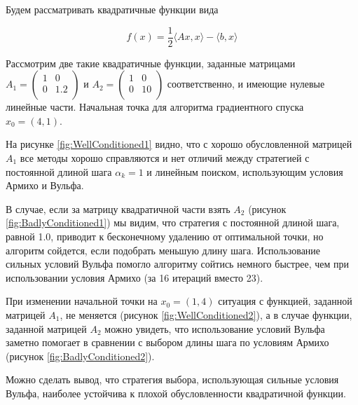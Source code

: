 \documentclass[11pt]{article}
\begin{document}
Будем рассматривать квадратичные функции вида

\begin{equation}\label{eqn:quadratic}
f(x)=\frac12\langle A x, x\rangle-\langle b, x\rangle \tag{*}
\end{equation}

Рассмотрим две такие квадратичные функции, заданные матрицами \\
$A_1 = \begin{pmatrix}
1 & 0 \\
0 & 1.2 \\
\end{pmatrix}$ и
$A_2 = \begin{pmatrix}
1 & 0 \\
0 & 10 \\
\end{pmatrix}$ соответственно, и имеющие нулевые линейные части. Начальная точка для алгоритма градиентного спуска $x_0=(4, 1)$.

На рисунке \ref{fig:WellConditioned1} видно, что с хорошо обусловленной матрицей $A_1$ все методы хорошо справляются и нет отличий между стратегией с постоянной длиной шага $\alpha_k = 1$ и линейным поиском, использующим условия Армихо и Вульфа.


В случае, если за матрицу квадратичной части взять $A_2$ (рисунок \ref{fig:BadlyConditioned1}) мы видим, что стратегия с постоянной длиной шага, равной 1.0, приводит к бесконечному удалению от оптимальной точки, но алгоритм сойдется, если подобрать меньшую длину шага. Использование сильных условий Вульфа помогло алгоритму сойтись немного быстрее, чем при использовании условия Армихо (за 16 итераций вместо 23).

При изменении начальной точки на $x_0=(1, 4)$ ситуация с функцией, заданной матрицей $A_1$, не меняется (рисунок \ref{fig:WellConditioned2}),
а в случае функции, заданной матрицей $A_2$ можно увидеть, что использование условий Вульфа заметно помогает в сравнении с выбором длины шага по условиям Армихо (рисунок \ref{fig:BadlyConditioned2}).

Можно сделать вывод, что стратегия выбора, использующая сильные условия Вульфа, наиболее устойчива к плохой обусловленности квадратичной функции.
\end{document}
